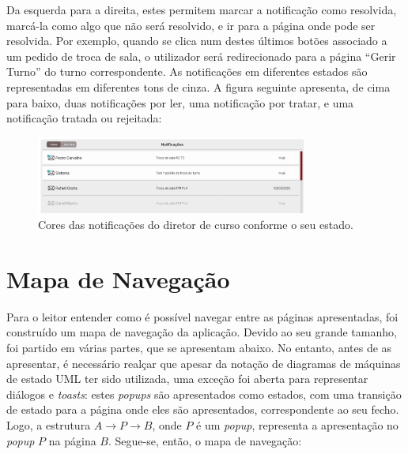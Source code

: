 \documentclass[12pt, a4paper]{article}
\begin{document}
Da esquerda para a direita, estes permitem marcar a notificação como resolvida, marcá-la como algo
que não será resolvido, e ir para a página onde pode ser resolvida. Por exemplo, quando se clica num
destes últimos botões associado a um pedido de troca de sala, o utilizador será redirecionado para a
página ``Gerir Turno'' do turno correspondente. As notificações em diferentes estados são
representadas em diferentes tons de cinza. A figura seguinte apresenta, de cima para baixo, duas
notificações por ler, uma notificação por tratar, e uma notificação tratada ou rejeitada:

\begin{figure}[H]
    \centering
    \includegraphics[width=0.8\textwidth]{res/prototype/notificacoes-diretor-cor.png}
    \caption{Cores das notificações do diretor de curso conforme o seu estado.}
    \label{notificacoes-diretor-cor}
\end{figure}

\section{Mapa de Navegação}

Para o leitor entender como é possível navegar entre as páginas apresentadas, foi construído um
mapa de navegação da aplicação. Devido ao seu grande tamanho, foi partido em várias partes, que
se apresentam abaixo. No entanto, antes de as apresentar, é necessário realçar que apesar da
notação de diagramas de máquinas de estado UML \cite{uml} ter sido utilizada, uma exceção foi aberta
para representar diálogos e \emph{toasts}: estes \emph{popups} são apresentados como estados, com
uma transição de estado para a página onde eles são apresentados, correspondente ao seu fecho. Logo,
a estrutura $A \rightarrow P \rightarrow B$, onde $P$ é um \emph{popup}, representa a apresentação
no \emph{popup} $P$ na página $B$. Segue-se, então, o mapa de navegação:
\end{document}
